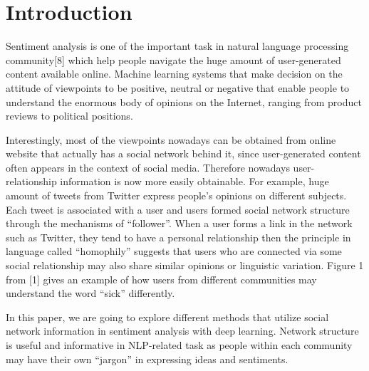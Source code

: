
\section{Introduction}
Sentiment analysis is one of the important task in natural language processing community[8] which help people navigate the huge amount of user-generated content available online. Machine learning systems that make decision on the attitude of viewpoints to be positive, neutral or negative that enable people to understand the enormous body of opinions on the Internet, ranging from product reviews to political positions. 

Interestingly, most of the viewpoints nowadays can be obtained from online website that actually has a social network behind it, since user-generated content often appears in the context of social media. Therefore nowadays user-relationship information is now more easily obtainable. For example, huge amount of tweets from Twitter express people's opinions on different subjects. Each tweet is associated with a user and users formed social network structure through the mechanisms of ``follower''. When a user forms a link in the network such as Twitter, they tend to have a personal relationship then the principle in language called ``homophily'' suggests that users who are connected via some social relationship may also share similar opinions or linguistic variation. Figure 1 from [1] gives an example of how users from different communities may understand the word ``sick'' differently.


In this paper, we are going to explore different methods that utilize social network information in sentiment analysis with deep learning. Network structure is useful and informative in NLP-related task as people within each community may have their own ``jargon'' in expressing ideas and sentiments. 
